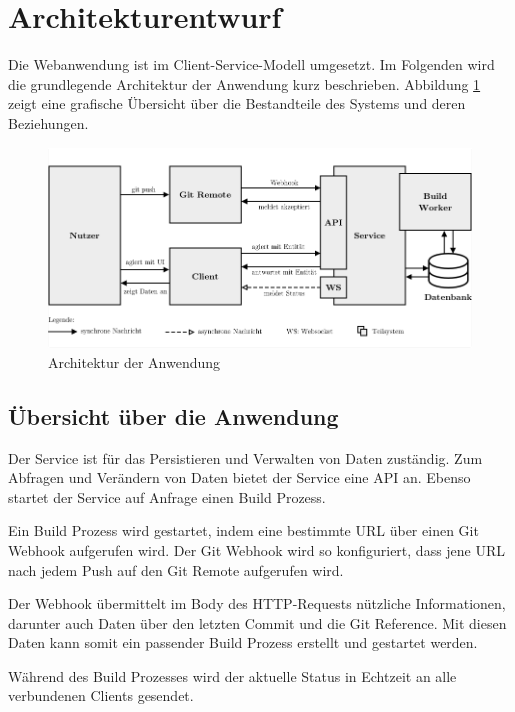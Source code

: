 \section{Architekturentwurf}

Die Webanwendung ist im Client-Service-Modell umgesetzt. Im Folgenden wird die grundlegende Architektur der Anwendung kurz beschrieben. Abbildung \ref{fig:architektur} zeigt eine grafische Übersicht über die Bestandteile des Systems und deren Beziehungen.

\begin{figure}[h]
  \caption{Architektur der Anwendung}
  \label{fig:architektur}
  \centering
    \includegraphics[width=\textwidth]{assets/architektur}
\end{figure}

\subsection{Übersicht über die Anwendung}
\label{subsec:uebersicht-anwendung}

Der Service ist für das Persistieren und Verwalten von Daten zuständig. Zum Abfragen und Verändern von Daten bietet der Service eine \ac{API} an. Ebenso startet der Service auf Anfrage einen Build Prozess.

Ein Build Prozess wird gestartet, indem eine bestimmte URL über einen Git Webhook aufgerufen wird. Der Git Webhook wird so konfiguriert, dass jene URL nach jedem Push auf den Git Remote aufgerufen wird.

Der Webhook übermittelt im Body des HTTP-Requests nützliche Informationen, darunter auch Daten über den letzten Commit und die Git Reference. Mit diesen Daten kann somit ein passender Build Prozess erstellt und gestartet werden.

Während des Build Prozesses wird der aktuelle Status in Echtzeit an alle verbundenen Clients gesendet.

